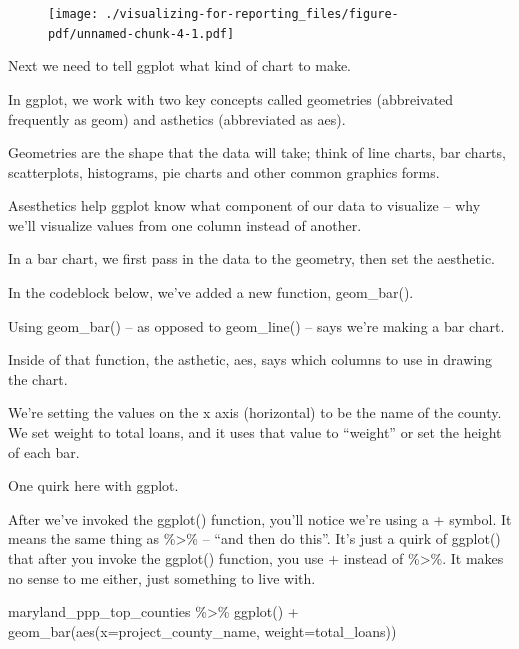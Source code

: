 \documentclass[
  letterpaper,
  DIV=11,
  numbers=noendperiod]{scrreprt}
\newenvironment{Shaded}{\begin{snugshade}}{\end{snugshade}}
\newcommand{\AttributeTok}[1]{\textcolor[rgb]{0.40,0.45,0.13}{#1}}
\newcommand{\FunctionTok}[1]{\textcolor[rgb]{0.28,0.35,0.67}{#1}}
\newcommand{\NormalTok}[1]{\textcolor[rgb]{0.00,0.23,0.31}{#1}}
\newcommand{\SpecialCharTok}[1]{\textcolor[rgb]{0.37,0.37,0.37}{#1}}
\begin{document}
\begin{figure}[H]

{\centering \texttt{[image: ./visualizing-for-reporting\_files/figure-pdf/unnamed-chunk-4-1.pdf]}

}

\end{figure}

Next we need to tell ggplot what kind of chart to make.

In ggplot, we work with two key concepts called geometries (abbreivated
frequently as geom) and asthetics (abbreviated as aes).

Geometries are the shape that the data will take; think of line charts,
bar charts, scatterplots, histograms, pie charts and other common
graphics forms.

Asesthetics help ggplot know what component of our data to visualize --
why we'll visualize values from one column instead of another.

In a bar chart, we first pass in the data to the geometry, then set the
aesthetic.

In the codeblock below, we've added a new function, geom\_bar().

Using geom\_bar() -- as opposed to geom\_line() -- says we're making a
bar chart.

Inside of that function, the asthetic, aes, says which columns to use in
drawing the chart.

We're setting the values on the x axis (horizontal) to be the name of
the county. We set weight to total loans, and it uses that value to
``weight'' or set the height of each bar.

One quirk here with ggplot.

After we've invoked the ggplot() function, you'll notice we're using a +
symbol. It means the same thing as \%\textgreater\% -- ``and then do
this''. It's just a quirk of ggplot() that after you invoke the ggplot()
function, you use + instead of \%\textgreater\%. It makes no sense to me
either, just something to live with.

\begin{Shaded}
\begin{Highlighting}[]
\NormalTok{maryland\_ppp\_top\_counties }\SpecialCharTok{\%\textgreater{}\%}
  \FunctionTok{ggplot}\NormalTok{() }\SpecialCharTok{+}
  \FunctionTok{geom\_bar}\NormalTok{(}\FunctionTok{aes}\NormalTok{(}\AttributeTok{x=}\NormalTok{project\_county\_name, }\AttributeTok{weight=}\NormalTok{total\_loans))}
\end{Highlighting}
\end{Shaded}
\end{document}
